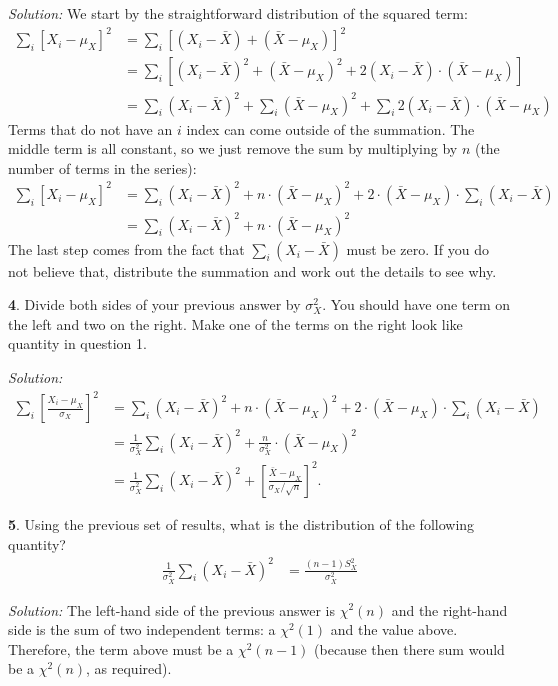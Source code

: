 \documentclass{tufte-handout}
\begin{document}
\textit{Solution:} We start by the straightforward
distribution of the squared term:
\begin{align*}
\sum_i \left[ X_i - \mu_X \right]^2 &= \sum_i \left[ (X_i - \bar{X}) + (\bar{X} - \mu_X) \right]^2 \\
&= \sum_i \left[ (X_i - \bar{X})^2 + (\bar{X} - \mu_X)^2 + 2 (X_i - \bar{X}) \cdot (\bar{X} - \mu_X) \right] \\
&= \sum_i (X_i - \bar{X})^2 + \sum_i (\bar{X} - \mu_X)^2 + \sum_i 2 (X_i - \bar{X}) \cdot (\bar{X} - \mu_X)
\end{align*}
Terms that do not have an $i$ index can come outside of the summation. The middle
term is all constant, so we just remove the sum by multiplying by $n$ (the number
of terms in the series):
\begin{align*}
\sum_i \left[ X_i - \mu_X \right]^2 
&= \sum_i (X_i - \bar{X})^2 + n \cdot (\bar{X} - \mu_X)^2 + 2 \cdot (\bar{X} - \mu_X) \cdot \sum_i  (X_i - \bar{X}) \\
&= \sum_i (X_i - \bar{X})^2 + n \cdot (\bar{X} - \mu_X)^2
\end{align*}
The last step comes from the fact that $\sum_i (X_i - \bar{X})$ must be zero. If
you do not believe that, distribute the summation and work out the details to see
why. 

\textbf{4}. Divide both sides of your previous answer by $\sigma_X^2$. You
should have one term on the left and two on the right. Make one of the terms
on the right look like quantity in question 1.

\textit{Solution:} \begin{align*}
\sum_i \left[ \frac{X_i - \mu_X}{\sigma_X} \right]^2 
&= \sum_i (X_i - \bar{X})^2 + n \cdot (\bar{X} - \mu_X)^2 + 2 \cdot (\bar{X} - \mu_X) \cdot \sum_i  (X_i - \bar{X}) \\
&= \frac{1}{\sigma_X^2} \sum_i (X_i - \bar{X})^2 + \frac{n}{\sigma_X^2} \cdot (\bar{X} - \mu_X)^2 \\
&= \frac{1}{\sigma_X^2} \sum_i (X_i - \bar{X})^2 + \left[\frac{\bar{X} - \mu_X}{\sigma_X / \sqrt{n}} \right]^2.
\end{align*}

\textbf{5}. Using the previous set of results, what is the distribution of
the following quantity?
\begin{align*}
\frac{1}{\sigma_X^2} \sum_i (X_i - \bar{X})^2 &= \frac{(n-1) S_X^2}{\sigma_X^2}
\end{align*}

\textit{Solution:} The left-hand side of the previous answer is $\chi^2(n)$ and the right-hand
side is the sum of two independent terms: a $\chi^2(1)$ and the value above. Therefore,
the term above must be a $\chi^2(n-1)$ (because then there sum would be a $\chi^2(n)$,
as required). 
\end{document}
